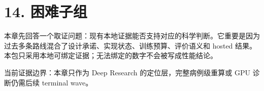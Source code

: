 \section{14. 困难子组}

本章先回答一个取证问题：现有本地证据能否支持对应的科学判断。它重要是因为过去多条路线混合了设计承诺、实现状态、训练预算、评价语义和 hosted 结果。本包只采用本地可绑定证据；无法绑定的数字不会被写成性能结论。



当前证据边界：本章只作为 Deep Research 的定位层，完整病例级重算或 GPU 诊断仍需后续 terminal wave。



\clearpage